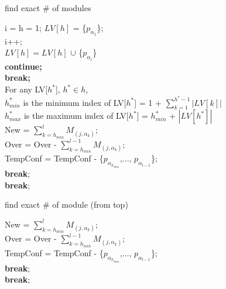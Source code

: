 \documentclass{article}
\begin{document}
\begin{algorithm}
    \caption{find exact \# of modules}
    \LinesNumbered    {}
    i = h = 1; $LV[h]$ = \{$p_{\alpha_1}$\};\\
        {i++;\\
            {$LV[h] = LV[h]$ $\cup$ \{$p_{\alpha_i}$\}\\
            \textup{\textbf{continue;}}}\\
            {\textup{\textbf{break;}}}\\
    }
    \textup{For any LV[$h^*$], $h^* \in h$,\\
    $h^*_{min}$ is the minimum index of LV[$h^*$] = 1 + $\sum^{h^*-1}_{k=1} \left|LV[k]\right|$\\
    $h^*_{max}$ is the maximum index of LV[$h^*$] = $h^*_{min}$ + $\left|LV[h^*]\right|$}\\
        {
            {New = $\sum^{l}_{k=h_{min}} M_{(j,\alpha_k)}$;\\
                {Over = Over - $\sum^{l-1}_{k=h_{min}} M_{(j,\alpha_k)}$;\\
                TempConf = TempConf - \{$p_{\alpha_{h_{min}}}$,..., $p_{\alpha_{l-1}}$\};\\
                \textup{\textbf{break}};\\
                }
            }
            {\textup{\textbf{break}};\\}
    }
\end{algorithm}


\begin{algorithm}
  \LinesNumbered
  \caption{find exact \# of module (from top)}
        {
            {New = $\sum^{l}_{k=h_{min}} M_{(j,\alpha_k)}$;\\
                {Over = Over - $\sum^{l-1}_{k=h_{min}} M_{(j,\alpha_k)}$;\\
                TempConf = TempConf - \{$p_{\alpha_{h_{min}}}$,..., $p_{\alpha_{l-1}}$\};\\
                \textup{\textbf{break}};\\
                }
            }
            {\textup{\textbf{break}};\\}
    }
\end{algorithm}
\end{document}
